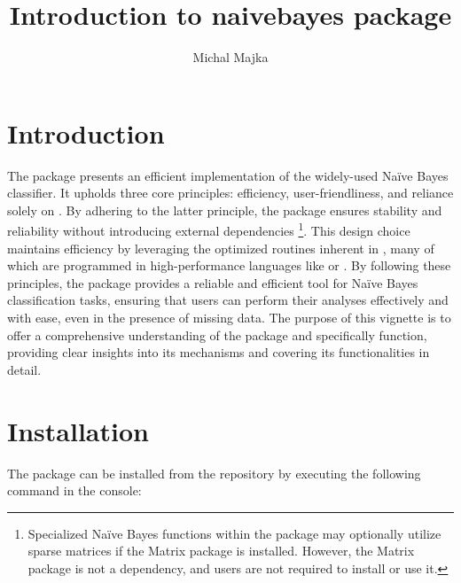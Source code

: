 \documentclass{article}\usepackage[]{graphicx}\usepackage[]{xcolor}
\begin{document}
\title{Introduction to naivebayes package}

\author{Michal Majka}

\onehalfspace



\maketitle

\section{Introduction}

The \textcolor{darkgreen}{{}} package presents an efficient implementation of the widely-used Na\"ive Bayes classifier. It upholds three core principles: efficiency, user-friendliness, and reliance solely on \textcolor{darkgreen}{{}}. By adhering to the latter principle, the package ensures stability and reliability without introducing external dependencies \footnote{Specialized Naïve Bayes functions within the package may optionally utilize sparse matrices if the Matrix package is installed. However, the Matrix package is not a dependency, and users are not required to install or use it.}. This design choice maintains efficiency by leveraging the optimized routines inherent in \textcolor{darkgreen}{{}}, many of which are programmed in high-performance languages like \textcolor{darkgreen}{{}} or \textcolor{darkgreen}{{}}. By following these principles, the \textcolor{darkgreen}{{}} package provides a reliable and efficient tool for Na\"ive Bayes classification tasks, ensuring that users can perform their analyses effectively and with ease, even in the presence of missing data. The purpose of this vignette is to offer a comprehensive understanding of the  \textcolor{darkgreen}{{}} package and specifically \textcolor{darkgreen}{{}} function, providing clear insights into its mechanisms and covering its functionalities in detail.

\section{Installation}

The \textcolor{darkgreen}{{}} package can be installed from the \textcolor{darkgreen}{{}} repository by executing the following command in the \textcolor{darkgreen}{{}} console:
\end{document}
